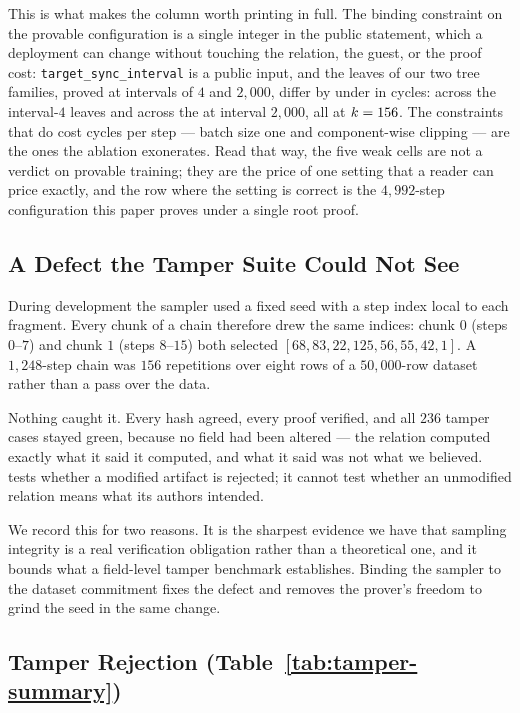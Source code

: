 This is what makes the column worth printing in full. The binding constraint on
the provable configuration is a single integer in the public statement, which a
deployment can change without touching the relation, the guest, or the proof
cost: \texttt{target\_sync\_interval} is a public input, and the leaves of our
two tree families, proved at intervals of $4$ and $2{,}000$, differ by under
\leafSpreadBound{} in cycles: \leafRangeSyncFour{} across the
\leafCountSyncFour{} interval-$4$ leaves and \leafRangeSyncTwoThousand{} across
the \leafCountSyncTwoThousand{} at interval $2{,}000$, all at $k = 156$. The constraints that do cost cycles per step --- batch size one
and component-wise clipping --- are the ones the ablation exonerates. Read that
way, the five weak cells are not a verdict on provable training; they are the
price of one setting that a reader can price exactly, and the row where the
setting is correct is the $4{,}992$-step configuration this paper proves under a
single root proof.

\subsection{A Defect the Tamper Suite Could Not See}
\label{subsec:sampling-defect}

During development the sampler used a fixed seed with a step index local to
each fragment. Every chunk of a chain therefore drew the same indices: chunk
$0$ (steps $0$--$7$) and chunk $1$ (steps $8$--$15$) both selected
$[68, 83, 22, 125, 56, 55, 42, 1]$. A $1{,}248$-step chain was $156$
repetitions over eight rows of a $50{,}000$-row dataset rather than a pass over
the data.

Nothing caught it. Every hash agreed, every proof verified, and all $236$
tamper cases stayed green, because no field had been altered --- the relation
computed exactly what it said it computed, and what it said was not what we
believed.  tests whether a modified artifact is
rejected; it cannot test whether an unmodified relation means what its authors
intended.

We record this for two reasons. It is the sharpest evidence we have that
sampling integrity is a real verification obligation rather than a theoretical
one, and it bounds what a field-level tamper benchmark establishes. Binding the
sampler to the dataset commitment fixes the defect and removes the prover's
freedom to grind the seed in the same change.

\subsection{Tamper Rejection (Table~\ref{tab:tamper-summary})}

